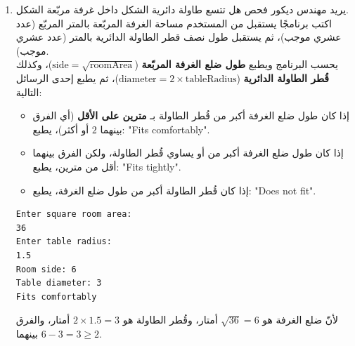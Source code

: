 \documentclass[14pt]{extarticle}
\begin{document}
\begin{enumerate}[resume, itemsep=2.2em]
\ifwithsols
\begin{boxSolution}
\begin{english}
\begin{verbatim}
Console.WriteLine("Enter total students:");
int students = int.Parse(Console.ReadLine());

int fullBuses = students / 45;
int remaining = students % 45;

Console.WriteLine("Full large buses: " + fullBuses);
Console.WriteLine("Remaining students: " + remaining);

if (remaining == 0)
{
    Console.WriteLine("No extra transport needed");
}
else if (remaining <= 15)
{
    Console.WriteLine("Need 1 minibus");
}
else
{
    Console.WriteLine("Need 1 extra large bus");
}
\end{verbatim}
\end{english}
\end{boxSolution}
\fi
\filbreak

\item
يريد مهندس ديكور فحص هل تتسع طاولة دائرية الشكل داخل غرفة مربّعة الشكل. \\
اكتب برنامجًا يستقبل من المستخدم مساحة الغرفة المربّعة بالمتر المربّع (عدد عشري موجب)، ثم يستقبل طول نصف قطر الطاولة الدائرية بالمتر (عدد عشري موجب). \\
يحسب البرنامج ويطبع \textbf{طول ضلع الغرفة المربّعة} ($\text{side} = \sqrt{\text{roomArea}}$)، وكذلك \textbf{قُطر الطاولة الدائرية} ($\text{diameter} = 2 \times \text{tableRadius}$)، ثم يطبع إحدى الرسائل التالية:
\begin{itemize}[nosep]
    \item إذا كان طول ضلع الغرفة أكبر من قُطر الطاولة بـ \textbf{مترين على الأقل} (أي الفرق بينهما $2$ أو أكثر)، يطبع: \textenglish{"Fits comfortably"}.
    \item إذا كان طول ضلع الغرفة أكبر من أو يساوي قُطر الطاولة، ولكن الفرق بينهما أقل من مترين، يطبع: \textenglish{"Fits tightly"}.
    \item إذا كان قُطر الطاولة أكبر من طول ضلع الغرفة، يطبع: \textenglish{"Does not fit"}.
\end{itemize}

\ifdetailed
\begin{boxExample}[1]
\begin{english}
\begin{verbatim}
Enter square room area:
36
Enter table radius:
1.5
Room side: 6
Table diameter: 3
Fits comfortably
\end{verbatim}
\end{english}
\end{boxExample}
لأنّ ضلع الغرفة هو $\sqrt{36} = 6$ أمتار، وقُطر الطاولة هو $2 \times 1.5 = 3$ أمتار، والفرق بينهما $6 - 3 = 3 \ge 2$.
\fi


\end{enumerate}
\end{document}
